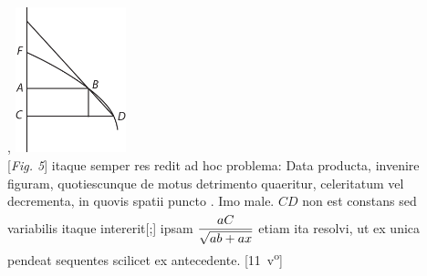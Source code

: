 ,
\pend
\vspace{0.9em}
\pstart
\noindent
\centering
\includegraphics[trim = 0mm -1mm 0mm 0mm, clip,width=0.24\textwidth]{images/lh03705_011r-d3.pdf}\\
\centering
{} [\textit{Fig. 5}] %
\pend
\newpage
\pstart
\noindent
itaque semper res redit ad hoc problema:
Data producta, invenire figuram, quotiescunque de motus detrimento quaeritur,
celeritatum vel decrementa, in quovis spatii puncto
.
   Imo male. $\displaystyle CD$ non est constans sed variabilis
itaque intererit[;] ipsam $\displaystyle \rule[-4mm]{0mm}{10mm}  \frac{aC}{\sqrt{ab + ax}}$
etiam ita resolvi, ut ex unica pendeat sequentes scilicet ex antecedente.  [11~v\textsuperscript{o}]
\pend
\count{}
\count{}
\count{}

